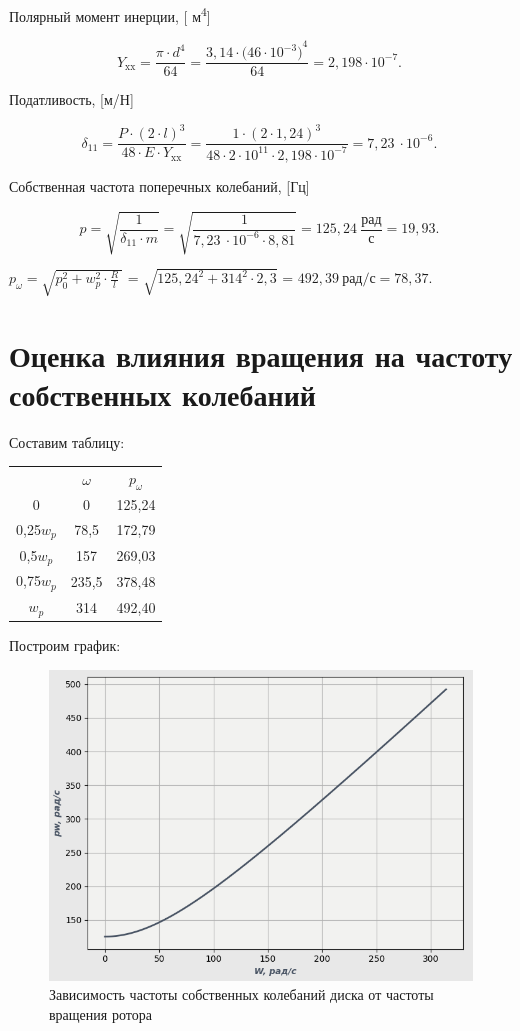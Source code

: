 Полярный момент инерции, [ м\textsuperscript{4}]

\[Y_{\text{xx}} = \frac{\pi\cdot d^{4}}{64} = \frac{3,14\cdot({46\cdot10^{- 3})}^{4}}{64} = 2,198\cdot10^{- 7}.\ \]

Податливость, [м/Н]

\[\delta_{11} = \frac{P\cdot{(2\cdot l)}^{3}}{48\cdot E\cdot Y_{\text{xx}}} = \frac{1\cdot{(2\cdot1,24)}^{3}}{48\cdot2\cdot10^{11}\cdot2,198\cdot10^{- 7}} = 7,23\ \cdot10^{- 6}.\ \]

Собственная частота поперечных колебаний, [Гц]

\[p = \sqrt{\frac{1}{\delta_{11}\cdot m}} = \sqrt{\frac{1}{7,23\ \cdot10^{- 6}\cdot8,81}} = 125,24\ \frac{рад}{с} = 19,93.\ \]

\(p_{\omega} = \sqrt{p_{0}^{2} + w_{p}^{2}\cdot\frac{R}{l}\ }\) =
\(\sqrt{{125,24}^{2} + 314^{2}\cdot2,3}\) = \(492,39\ рад/с = 78,37.\ \)
\newpage

\section{Оценка влияния вращения на частоту собственных колебаний}

Составим таблицу:

\begin{center}
\begin{tabular}{ccc}
& \(\omega\) & \(p_{\omega}\)\\
0 & 0 & 125,24\\
0,25\(w_{p}\) & 78,5 & 172,79\\
0,5\(w_{p}\) & 157 & 269,03\\
0,75\(w_{p}\) & 235,5 & 378,48\\
\(w_{p}\) & 314 & 492,40\\
\end{tabular}
\end{center}

Построим график:
\begin{figure}[h]
\center
\includegraphics[width=120mm]{graph.png}
\caption{Зависимость частоты собственных колебаний диска от частоты вращения ротора} \label{fig:2}
\end{figure}

